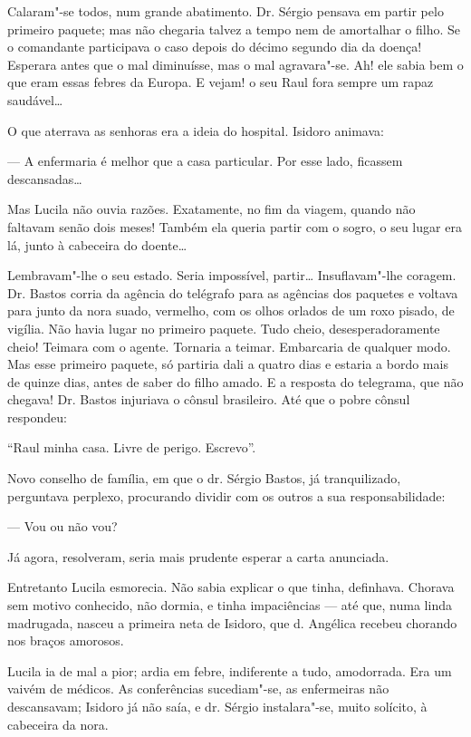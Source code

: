 Calaram"-se todos, num grande abatimento. Dr. Sérgio pensava em partir
pelo primeiro paquete; mas não chegaria talvez a tempo nem de amortalhar
o filho. Se o comandante participava o caso depois do décimo segundo dia
da doença! Esperara antes que o mal diminuísse, mas o mal agravara"-se.
Ah! ele sabia bem o que eram essas febres da Europa. E vejam! o seu Raul
fora sempre um rapaz saudável\ldots{}

O que aterrava as senhoras era a ideia do hospital. Isidoro animava:

--- A enfermaria é melhor que a casa particular. Por esse lado, ficassem
descansadas\ldots{}

Mas Lucila não ouvia razões. Exatamente, no fim da viagem, quando não
faltavam senão dois meses! Também ela queria partir com o sogro, o seu
lugar era lá, junto à cabeceira do doente\ldots{}

Lembravam"-lhe o seu estado. Seria impossível, partir\ldots{} Insuflavam"-lhe
coragem. Dr. Bastos corria da agência do telégrafo para as agências dos
paquetes e voltava para junto da nora suado, vermelho, com os olhos
orlados de um roxo pisado, de vigília. Não havia lugar no primeiro
paquete. Tudo cheio, desesperadoramente cheio! Teimara com o agente.
Tornaria a teimar. Embarcaria de qualquer modo. Mas esse primeiro
paquete, só partiria dali a quatro dias e estaria a bordo mais de quinze
dias, antes de saber do filho amado. E a resposta do telegrama, que não
chegava! Dr. Bastos injuriava o cônsul brasileiro. Até que o pobre
cônsul respondeu:

``Raul minha casa. Livre de perigo. Escrevo''.

Novo conselho de família, em que o dr. Sérgio Bastos, já tranquilizado,
perguntava perplexo, procurando dividir com os outros a sua
responsabilidade:

--- Vou ou não vou?

Já agora, resolveram, seria mais prudente esperar a carta anunciada.

Entretanto Lucila esmorecia. Não sabia explicar o que tinha, definhava.
Chorava sem motivo conhecido, não dormia, e tinha impaciências --- até
que, numa linda madrugada, nasceu a primeira neta de Isidoro, que d.
Angélica recebeu chorando nos braços amorosos.

Lucila ia de mal a pior; ardia em febre, indiferente a tudo, amodorrada.
Era um vaivém de médicos. As conferências sucediam"-se, as enfermeiras
não descansavam; Isidoro já não saía, e dr. Sérgio instalara"-se, muito
solícito, à cabeceira da nora.

